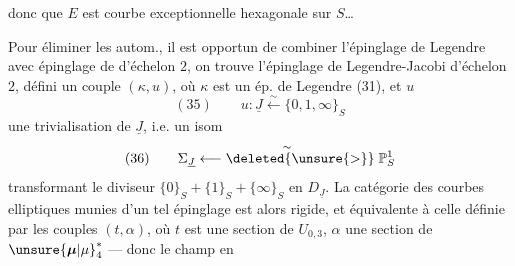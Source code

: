 
donc que $E$ est  courbe exceptionnelle hexagonale sur $S$\ldots

Pour éliminer les autom., il est opportun de combiner l'épinglage de Legendre avec épinglage de  d'échelon $2$, on trouve l'épinglage de Legendre-Jacobi d'échelon $2$, défini  un couple $(\kappa,u)$, où $\kappa$ est un ép. de Legendre (31), et  $u$
\[
(35)\qquad u:\underline{J}\xleftarrow{\sim}\{0,1,\infty\}_S
\]
une trivialisation de $\underline{J}$, i.e. un isom
\[
(36)\qquad\Sigma_{\underline{J}}\overset{\sim}{\longleftarrow\deleted{\unsure{>}}}\mathbb{P}^1_S
\]
transformant le diviseur $\{0\}_S+\{1\}_S+\{\infty\}_S$ en $D_{\underline{J}}$. La catégorie des courbes elliptiques munies d'un tel épinglage est alors rigide, et équivalente à celle définie par les couples $(t,\alpha)$, où $t$ est une section de $U_{0,3}$, $\alpha$ une section de $\unsure{\boldsymbol{\mu}|\mu}_4^*$ --- donc le  champ en
